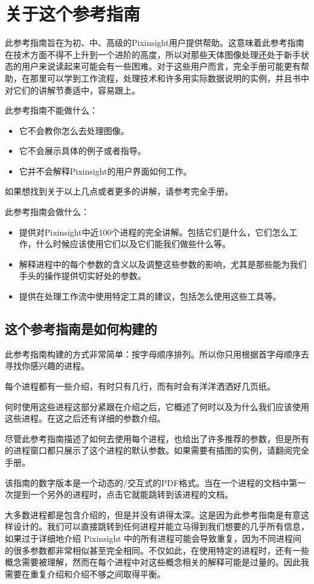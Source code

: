 \chapter{关于这个参考指南}

此参考指南旨在为初、中、高级的Pixinsight用户提供帮助。这意味着此参考指南在技术方面不得不上升到一个进阶的高度，所以对那些天体图像处理还处于新手状态的用户来说读起来可能会有一些困难。对于这些用户而言，完全手册可能更有帮助，在那里可以学到工作流程，处理技术和许多用实际数据说明的实例，并且书中对它们的讲解节奏适中，容易跟上。

此参考指南不能做什么：

\begin{itemize}
  \item 它不会教你怎么去处理图像。
  \item 它不会展示具体的例子或者指导。
  \item 它并不会解释Pixinsight的用户界面如何工作。
\end{itemize}

如果想找到关于以上几点或者更多的讲解，请参考完全手册。

此参考指南会做什么：

\begin{itemize}
  \item 提供对Pixinsight中近100个进程的完全讲解。包括它们是什么，它们怎么工作，什么时候应该使用它们以及它们能我们做些什么等。
  \item 解释进程中的每个参数的含义以及调整这些参数的影响，尤其是那些能为我们手头的操作提供切实好处的参数。
  \item 提供在处理工作流中使用特定工具的建议，包括怎么使用这些工具等。
\end{itemize}


\section{这个参考指南是如何构建的}

此参考指南构建的方式非常简单：按字母顺序排列。所以你只用根据首字母顺序去寻找你感兴趣的进程。

每个进程都有一些介绍，有时只有几行，而有时会有洋洋洒洒好几页纸。

何时使用这些进程这部分紧跟在介绍之后，它概述了何时以及为什么我们应该使用这些进程。在这之后还有详细的参数介绍。

尽管此参考指南描述了如何去使用每个进程，也给出了许多推荐的参数，但是所有的进程窗口都只展示了这个进程的默认参数。如果需要有插图的实例，请翻阅完全手册。

该指南的数字版本是一个动态的/交互式的PDF格式。当在一个进程的文档中第一次提到一个另外的进程时，点击它就能跳转到该进程的文档。

大多数进程都是包含介绍的，但是并没有讲得太深。这是因为此参考指南是有意这样设计的。我们可以直接跳转到任何进程并能立马得到我们想要的几乎所有信息，如果过于详细地介绍 Pixinsight 中的所有进程可能会导致重复，因为不同进程间的很多参数都非常相似甚至完全相同。不仅如此，在使用特定的进程时，还有一些概念需要被理解，然而在每个进程中对这些概念相关的解释可能是过量的。因此我需要在重复介绍和介绍不够之间取得平衡。